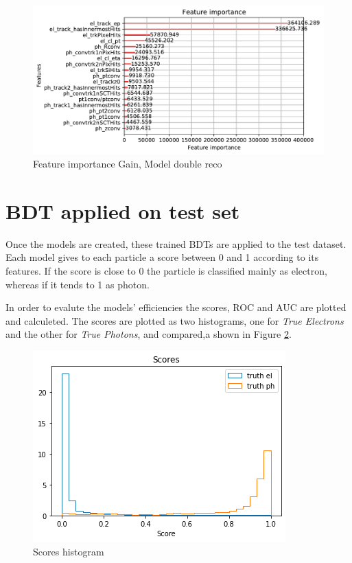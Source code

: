 \documentclass[a4paper, oneside]{book}
\begin{document}
\begin{itemize}
					\begin{figure}[h!]
						\centering
						\includegraphics[width=.8\linewidth]{tesi_images/model_hyper_gain.pdf} 
						\caption{Feature importance Gain, Model double reco}
						\label{fig:gain} 
					\end{figure}
				\end{itemize}
			
		\section{BDT applied on test set}
			Once the models are created, these trained BDTs are applied to the test dataset. Each model gives to each particle a score between 0 and 1 according to its features. If the score is close to 0 the particle is classified mainly as electron, whereas if it tends to 1 as photon. 
			
			In order to evalute the models' efficiencies the scores, ROC and AUC are plotted and calculeted. The scores are plotted as two histograms, one for \textit{True Electrons} and the other for \textit{True Photons}, and compared,a shown in Figure \ref{fig:scores}.
		    \begin{figure}[h!]
		    	\centering
		    	\includegraphics[width=.6\linewidth]{tesi_images/scores.png} 
		    	\caption{Scores histogram} 
		    	\label{fig:scores}
		    \end{figure}
		    
\end{document}
